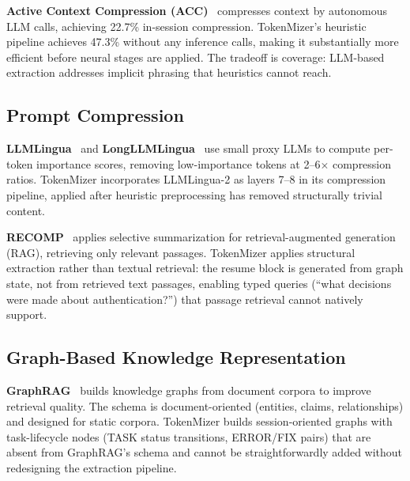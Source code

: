 \documentclass[journal]{IEEEtran}
\begin{document}
\textbf{Active Context Compression (ACC)}~\cite{acc} compresses
context by autonomous LLM calls, achieving 22.7\%
in-session compression.
TokenMizer's heuristic pipeline achieves 47.3\% without any
inference calls, making it substantially more efficient
before neural stages are applied.
The tradeoff is coverage: LLM-based extraction addresses
implicit phrasing that heuristics cannot reach.

\subsection{Prompt Compression}

\textbf{LLMLingua}~\cite{llmlingua} and
\textbf{LongLLMLingua}~\cite{longllmlingua} use small proxy
LLMs to compute per-token importance scores, removing
low-importance tokens at 2--6$\times$ compression ratios.
TokenMizer incorporates LLMLingua-2 as layers 7--8 in its
compression pipeline, applied after heuristic preprocessing
has removed structurally trivial content.

\textbf{RECOMP}~\cite{recomp} applies selective summarization
for retrieval-augmented generation (RAG), retrieving only
relevant passages.
TokenMizer applies structural extraction rather than textual
retrieval: the resume block is generated from graph state,
not from retrieved text passages, enabling typed queries
(``what decisions were made about authentication?'') that
passage retrieval cannot natively support.

\subsection{Graph-Based Knowledge Representation}

\textbf{GraphRAG}~\cite{graphrag} builds knowledge graphs
from document corpora to improve retrieval quality.
The schema is document-oriented (entities, claims,
relationships) and designed for static corpora.
TokenMizer builds session-oriented graphs with task-lifecycle
nodes (TASK status transitions, ERROR/FIX pairs) that are
absent from GraphRAG's schema and cannot be straightforwardly
added without redesigning the extraction pipeline.
\end{document}
